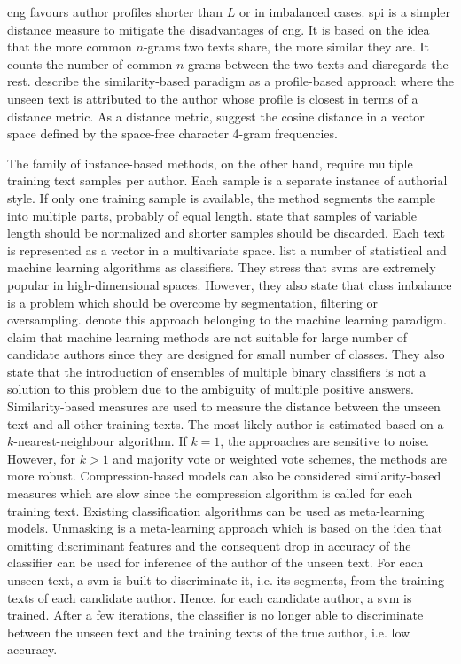 \ac{cng} favours author profiles shorter than $L$ or in imbalanced cases.
\ac{spi} is a simpler distance measure to mitigate the disadvantages of \ac{cng}.
It is based on the idea that the more common $n$-grams two texts share, the more similar they are.
It counts the number of common $n$-grams between the two texts and disregards the rest.
\cite{koppel_authorship_2011} describe the similarity-based paradigm as a profile-based approach 
where the unseen text is attributed to the author whose profile is closest in terms of a distance metric.
As a distance metric, \citet{koppel_authorship_2011} suggest the cosine distance in a vector space 
defined by the space-free character 4-gram frequencies.

The family of instance-based methods, on the other hand, require multiple training text samples per author. 
Each sample is a separate instance of authorial style.
If only one training sample is available, the method segments the sample into multiple parts, probably of equal length.
\citet{stamatatos_survey_2009} state that samples of variable length should be normalized and 
shorter samples should be discarded.
Each text is represented as a vector in a multivariate space.
\citet{stamatatos_survey_2009} list a number of statistical and machine learning algorithms as classifiers.
They stress that \acp{svm} are extremely popular in high-dimensional spaces.
However, they also state that class imbalance is a problem 
which should be overcome by segmentation, filtering or oversampling.
\citet{koppel_authorship_2011,koppel_determining_2014} denote this approach belonging to the machine learning paradigm.
\citet{koppel_determining_2014} claim that machine learning methods are not suitable for large number of candidate authors 
since they are designed for small number of classes. 
They also state that the introduction of ensembles of multiple binary classifiers is not a solution to this problem 
due to the ambiguity of multiple positive answers.
Similarity-based measures are used to measure the distance between the unseen text and all other training texts.
The most likely author is estimated based on a $k$-nearest-neighbour algorithm.
If $k=1$, the approaches are sensitive to noise.
However, for $k>1$ and majority vote or weighted vote schemes, the methods are more robust.
Compression-based models can also be considered similarity-based measures which are slow 
since the compression algorithm is called for each training text.
Existing classification algorithms can be used as meta-learning models.
Unmasking is a meta-learning approach which is based on the idea that
omitting discriminant features and the consequent drop in accuracy of the classifier 
can be used for inference of the author of the unseen text.
For each unseen text, a \ac{svm} is built to discriminate it, i.e. its segments, 
from the training texts of each candidate author.
Hence, for each candidate author, a \ac{svm} is trained.
After a few iterations, the classifier is no longer able to discriminate between the unseen text and 
the training texts of the true author, i.e. low accuracy.


